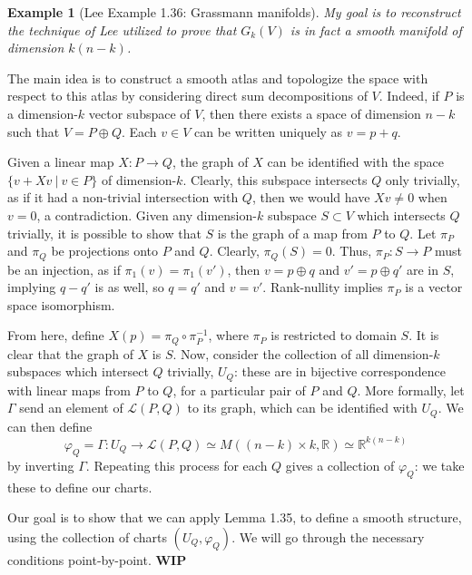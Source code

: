 \documentclass[aps,pra,showpacs,notitlepage,onecolumn,superscriptaddress,nofootinbib]{revtex4-1}
\theoremstyle{definition}
\newtheorem{example}{Example}[section]
\begin{document}
  \begin{example}[Lee Example 1.36: Grassmann manifolds]
    \textit{My goal is to reconstruct the technique of Lee utilized to prove that $G_k(V)$ is in fact a smooth manifold of dimension $k(n-k)$.}
    \newline

    \noindent The main idea is to construct a smooth atlas and topologize the space with respect to this atlas by considering direct sum decompositions of $V$. Indeed, if $P$ is a dimension-$k$
    vector subspace of $V$, then there exists a space of dimension $n - k$ such that $V = P \oplus Q$. Each $v \in V$ can be written uniquely as $v = p + q$.

    Given a linear map $X : P \rightarrow Q$, the graph of $X$ can be identified with the space $\{v + Xv \ | \ v \in P\}$ of dimension-$k$. Clearly, this subspace intersects $Q$ only trivially,
    as if it had a non-trivial intersection with $Q$, then we would have $Xv \neq 0$ when $v = 0$, a contradiction. Given any dimension-$k$ subspace $S \subset V$ which intersects $Q$ trivially, it is
    possible to show that $S$ is the graph of a map from $P$ to $Q$. Let $\pi_P$ and $\pi_Q$ be projections onto $P$ and $Q$. Clearly, $\pi_Q(S) = 0$. Thus, $\pi_P : S \rightarrow P$ must be an injection, as
    if $\pi_1(v) = \pi_1(v')$, then $v = p \oplus q$ and $v' = p \oplus q'$ are in $S$, implying $q - q'$ is as well, so $q = q'$ and $v = v'$. Rank-nullity implies $\pi_P$ is a vector space isomorphism.

    From here, define $X(p) = \pi_Q \circ \pi_{P}^{-1}$, where $\pi_P$ is restricted to domain $S$. It is clear that the graph of $X$ is $S$. Now, consider the collection of all dimension-$k$ subspaces which intersect
    $Q$ trivially, $U_Q$: these are in bijective correspondence
    with linear maps from $P$ to $Q$, for a particular pair of $P$ and $Q$. More formally, let $\Gamma$ send an element of $\mathcal{L}(P, Q)$ to its graph, which can be identified with $U_Q$. We can then define
    \begin{equation}
      \varphi_Q = \Gamma : U_Q \rightarrow \mathcal{L}(P, Q) \simeq M((n - k) \times k, \mathbb{R}) \simeq \mathbb{R}^{k(n - k)}
    \end{equation}
    by inverting $\Gamma$. Repeating this process for each $Q$ gives a collection of $\varphi_Q$: we take these to define our charts.

    Our goal is to show that we can apply Lemma 1.35, to define a smooth structure, using the collection of charts $(U_Q, \varphi_Q)$. We will go through the necessary conditions point-by-point. \textbf{WIP}
  \end{example}
\end{document}
